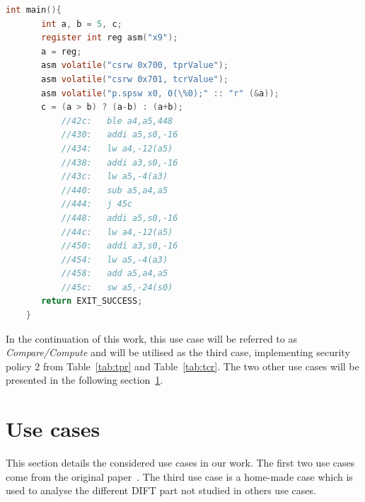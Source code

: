 \begin{lstlisting}[style=topPosition, caption=Compare/Compute C Code, language=C, label=code:compcompu]
    int main(){
       int a, b = 5, c;
       register int reg asm("x9");
       a = reg;
       asm volatile("csrw 0x700, tprValue");
       asm volatile("csrw 0x701, tcrValue");
       asm volatile("p.spsw x0, 0(\%0);" :: "r" (&a));
       c = (a > b) ? (a-b) : (a+b);
           //42c:   ble a4,a5,448
           //430:   addi a5,s0,-16
           //434:   lw a4,-12(a5)
           //438:   addi a3,s0,-16
           //43c:   lw a5,-4(a3)
           //440:   sub a5,a4,a5
           //444:   j 45c
           //448:   addi a5,s0,-16
           //44c:   lw a4,-12(a5)
           //450:   addi a3,s0,-16
           //454:   lw a5,-4(a3)
           //458:   add a5,a4,a5
           //45c:   sw a5,-24(s0)
       return EXIT_SUCCESS;
    }\end{lstlisting}

In the continuation of this work, this use case will be referred to as \textit{Compare/Compute} and will be utilised as the third case, implementing security policy 2 from Table~\ref{tab:tpr} and Table~\ref{tab:tcr}. The two other use cases will be presented in the following section~\ref{section:uses_cases}.

\section{Use cases}
\label{section:uses_cases}

This section details the considered use cases in our work. The first two use cases come from the original paper~\cite{PDGLC-18-hpec}. The third use case is a home-made case which is used to analyse the different DIFT part not studied in others use cases.

